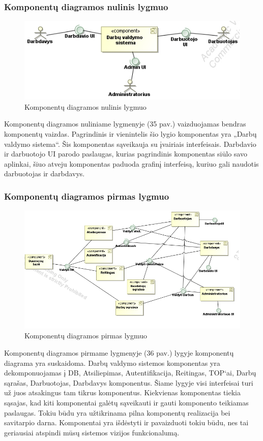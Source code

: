 \documentclass{VUMIFPSkursinis}
\begin{document}
\subsubsection{Komponentų diagramos nulinis lygmuo}
\begin{figure}[H]
\centering
\includegraphics[width=\linewidth, frame]{img/komponentu0.png}
\caption{Komponentų diagramos nulinis lygmuo}
\end{figure}
Komponentų diagramos nuliniame lygmenyje (35 pav.) vaizduojamas bendras komponentų vaizdas. Pagrindinis ir vienintelis šio lygio komponentas yra „Darbų valdymo sistema“. Šis komponentas sąveikauja su įvairiais interfeisais. Darbdavio ir darbuotojo UI parodo paslaugas, kurias pagrindinis komponentas siūlo savo aplinkai, šiuo atveju komponentas paduoda grafinį interfeisą, kuriuo gali naudotis darbuotojas ir darbdavys.
\subsubsection{Komponentų diagramos pirmas lygmuo}
\begin{figure}[H]
\centering
\includegraphics[width=\linewidth, frame]{img/komponentu2.png}
\caption{Komponentų diagramos pirmas lygmuo}
\end{figure}
Komponentų diagramos pirmame lygmenyje (36 pav.) lygyje komponentų diagrama yra suskaidoma. Darbų valdymo sistemos komponentas yra dekomponuojamas į DB, Atsiliepimas, Autentifikacija, Reitingas, TOP‘ai, Darbų sąrašas, Darbuotojas, Darbdavys komponentus. Šiame lygyje visi interfeisai turi už juos atsakingus tam tikrus komponentus. Kiekvienas komponentas tiekia sąsajas, kad kiti komponentai galėtų sąveikauti ir gauti komponento teikiamas paslaugas. Tokiu būdu yra užtikrinama pilna komponentų realizacija bei savitarpio darna. 
Komponentai yra išdėstyti ir pavaizduoti tokiu būdu, nes tai geriausiai atspindi mūsų sistemos vizijos funkcionalumą. 
\end{document}
